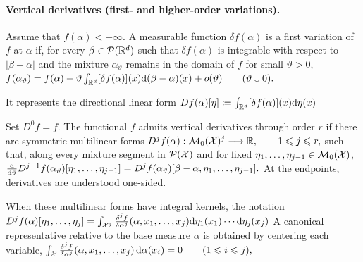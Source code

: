 \paragraph{Vertical derivatives (first- and higher-order variations).}
\begin{defn}\label{def-first-variation}
Assume that \(f(\alpha)<+\infty\). A measurable function \(\delta f(\alpha)\) is a first variation of \(f\) at \(\alpha\) if, for every \(\beta\in\mathcal{P}(\mathbb{R}^d)\) such that \(\delta f(\alpha)\) is integrable with respect to \(\lvert\beta-\alpha\rvert\) and the mixture \(\alpha_\vartheta\) remains in the domain of \(f\) for small \(\vartheta>0\),
\(f(\alpha_\vartheta) = f(\alpha) +\vartheta\int_{\mathbb{R}^d}[\delta f(\alpha)](x) \mathrm{d}(\beta-\alpha)(x) +o(\vartheta) \qquad(\vartheta\downarrow0).\)
\end{defn}
It represents the directional linear form
\(Df(\alpha)[\eta] \coloneqq \int_{\mathbb{R}^d}[\delta f(\alpha)](x)\mathrm{d}\eta(x)\)
\begin{defn}\label{def-higher-order-vertical-derivatives}
Set \(D^0f=f\). The functional \(f\) admits vertical derivatives through order \(r\) if there are symmetric multilinear forms
\(D^j f(\alpha):\mathcal{M}_0(\mathcal{X})^j\longrightarrow\mathbb{R}, \qquad 1\leqslant j\leqslant r,\)
such that, along every mixture segment in \(\mathcal{P}(\mathcal{X})\) and for fixed \(\eta_1,\ldots,\eta_{j-1}\in\mathcal{M}_0(\mathcal{X})\),
\(\frac{\mathrm{d}}{\mathrm{d}\vartheta} D^{j-1}f(\alpha_\vartheta)[\eta_1,\ldots,\eta_{j-1}] = D^j f(\alpha_\vartheta) [\beta-\alpha,\eta_1,\ldots,\eta_{j-1}].\)
At the endpoints, derivatives are understood one-sided.
\end{defn}
When these multilinear forms have integral kernels, the notation
\(D^j f(\alpha)[\eta_1,\ldots,\eta_j] = \int_{\mathcal{X}^j} \frac{\delta^j f}{\delta\alpha^j} (\alpha,x_1,\ldots,x_j) \mathrm{d}\eta_1(x_1)\cdots\mathrm{d}\eta_j(x_j)\)
A canonical representative relative to the base measure \(\alpha\) is obtained by centering each variable, \(\int_{\mathcal{X}} \frac{\delta^j f}{\delta\alpha^j} (\alpha,x_1,\ldots,x_j)\,\mathrm{d}\alpha(x_i)=0 \qquad (1\leqslant i\leqslant j),\)

